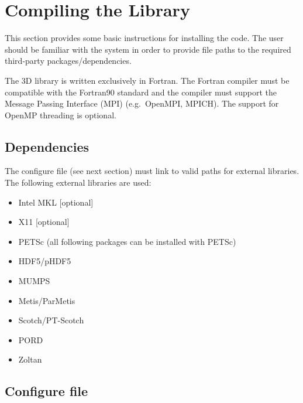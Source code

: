 \section{Compiling the Library}
\label{sec:compiling}

This section provides some basic instructions for installing the code. The user should be familiar with the system in order to provide file paths to the required third-party packages/dependencies.

The \hp3D library is written exclusively in Fortran. The Fortran compiler must be compatible with the Fortran90 standard and the compiler must support the Message Passing Interface (MPI) (e.g.~OpenMPI, MPICH). The support for OpenMP threading is optional.

\subsection{Dependencies}
\label{sec:dependencies}

The configure file  (see next section) must link to valid paths for external libraries. The following external libraries are used:
\begin{itemize}
	\itemsep 0pt
	\item Intel MKL [optional]
	\item X11 [optional]
	\item PETSc \cite{petsc-user-ref} (all following packages can be installed with PETSc)
	\item HDF5/pHDF5 \cite{hdf5}
	\item MUMPS \cite{amestoy2001mumps}
	\item Metis/ParMetis \cite{parmetis}
	\item Scotch/PT-Scotch \cite{pt-scotch}
	\item PORD
	\item Zoltan \cite{ZoltanOverviewArticle2002}
\end{itemize}

\subsection{Configure file}
\label{sec:configure-file}

